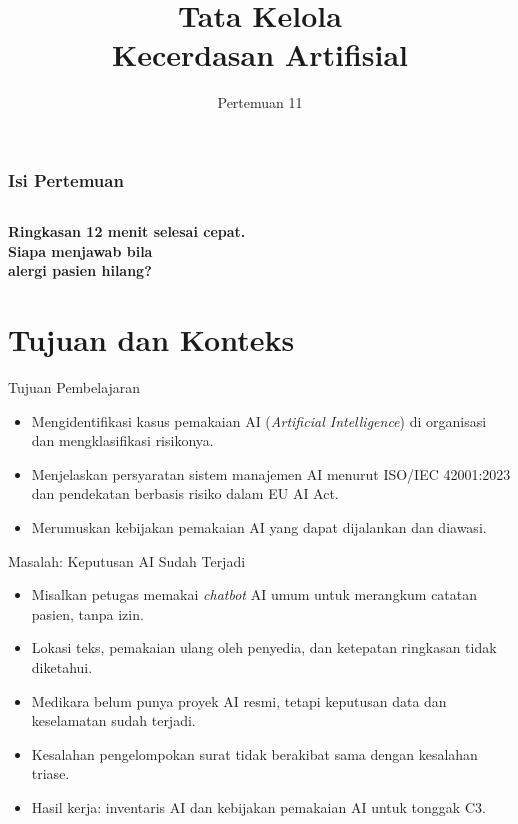 \documentclass[aspectratio=169, table, 12pt]{beamer}
\title{\Huge Tata Kelola\\ \vspace{10pt} Kecerdasan Artifisial}
\date{Pertemuan 11}
\begin{document}
\frame{\titlepage}

\begin{frame}
  \frametitle{Isi Pertemuan}
  \vspace{14pt}
  \begin{columns}[t]
    {\small\tableofcontents[sections={1-4}]}

    {\small\tableofcontents[sections={5-8}]}
  \end{columns}
\end{frame}

\begin{frame}{\hfill}
  \centering
  \Huge{\textbf{Ringkasan 12 menit selesai cepat.\\Siapa menjawab bila\\alergi pasien hilang?}}
\end{frame}

\section{Tujuan dan Konteks}

\begin{frame}{{\Large Tujuan Pembelajaran}}
  \vspace{10pt}
  \begin{itemize}
    \item Mengidentifikasi kasus pemakaian AI (\textit{Artificial Intelligence}) di organisasi dan
          mengklasifikasi risikonya.
    \item Menjelaskan persyaratan sistem manajemen AI menurut ISO/IEC 42001:2023 dan pendekatan
          berbasis risiko dalam EU AI Act.
    \item Merumuskan kebijakan pemakaian AI yang dapat dijalankan dan diawasi.
  \end{itemize}
\end{frame}

\begin{frame}{{\Large Masalah: Keputusan AI Sudah Terjadi}}
  \vspace{6pt}
  \small
  \begin{itemize}
    \item Misalkan petugas memakai \textit{chatbot} AI umum untuk merangkum catatan pasien, tanpa
          izin.
    \item Lokasi teks, pemakaian ulang oleh penyedia, dan ketepatan ringkasan tidak diketahui.
    \item Medikara belum punya proyek AI resmi, tetapi keputusan data dan keselamatan sudah terjadi.
    \item Kesalahan pengelompokan surat tidak berakibat sama dengan kesalahan triase.
    \item Hasil kerja: inventaris AI dan kebijakan pemakaian AI untuk tonggak C3.
  \end{itemize}
\end{frame}
\end{document}
